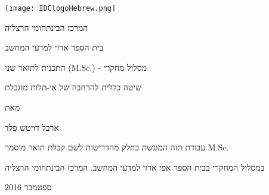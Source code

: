 \documentclass[12pt]{article}
\begin{document}
\begin{titlepage}
	\centering
	\texttt{[image: IDClogoHebrew.png]}\par\vspace{2cm}
	{\huge \begin{hebrew}{המרכז הבינתחומי הרצליה}\end{hebrew} \par}
	{\Large \begin{hebrew}{בית הספר ארזי למדעי המחשב}\end{hebrew} \par}
	{\Large \begin{hebrew}{התכנית לתואר שני (M.Sc.) - מסלול מחקרי}\end{hebrew} \par}
	
	\vspace{1cm}
	
	\vspace{1.5cm}
	{\Huge \begin{hebrew} שיטה כללית להרחבה של אי-תלות מוגבלת \end{hebrew} \par}
	\vspace{3cm}
	{\large \begin{hebrew}{מאת}\end{hebrew}\par}
	{\large\bfseries \begin{hebrew} ארבל דויטש פלד \end{hebrew} \par}
	
	\vspace{2cm}
	
	{\begin{hebrew}{עבודת תזה המוגשת כחלק מהדרישות לשם קבלת תואר מוסמך M.Sc.}\end{hebrew}\par}
	{\begin{hebrew}{במסלול המחקרי בבית הספר אפי ארזי למדעי המחשב, המרכז הבינתחומי הרצליה}\end{hebrew}\par}
	
	\vfill
	
	{\large\begin{hebrew}{ספטמבר 2016}\end{hebrew}\par}
\end{titlepage}
\end{document}
